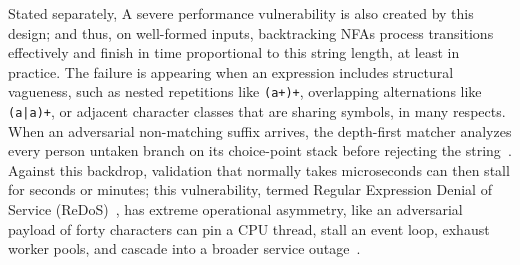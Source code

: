 \documentclass{ieeeaccess}
\begin{document}
Stated separately, A severe performance vulnerability is also created by this design; and thus, on well-formed inputs, backtracking NFAs process transitions effectively and finish in time proportional to this string length, at least in practice. The failure is appearing when an expression includes structural vagueness, such as nested repetitions like \texttt{(a+)+}, overlapping alternations like \texttt{(a|a)+}, or adjacent character classes that are sharing symbols, in many respects. When an adversarial non-matching suffix arrives, the depth-first matcher analyzes every person untaken branch on its choice-point stack before rejecting the string~\cite{berglund2014analyzing,weideman2016analyzing,staicu2018freezing}. Against this backdrop, validation that normally takes microseconds can then stall for seconds or minutes; this vulnerability, termed Regular Expression Denial of Service (ReDoS)~\cite{cox2010regular,kirrage2013static}, has extreme operational asymmetry, like an adversarial payload of forty characters can pin a CPU thread, stall an event loop, exhaust worker pools, and cascade into a broader service outage~\cite{staicu2018freezing,davis2019interview}.
\end{document}
